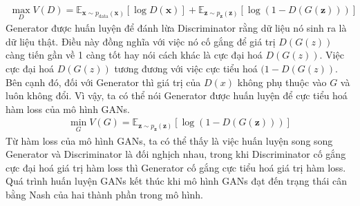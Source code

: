 {    \begin{align}
    \max_D V(D) = \mathbb{E}_{\bm{x} \sim p_{\text{data}}(\bm{x})}[\log D(\bm{x})] + \mathbb{E}_{\bm{z} \sim p_{\bm{z}}(\bm{z})}[\log (1 - D(G(\bm{z})))]
    \label{func:dis_loss}
    \end{align}
    Generator được huấn luyện để đánh lừa Discriminator rằng dữ liệu nó sinh ra là dữ liệu thật. Điều này đồng nghĩa với việc nó cố gắng để giá trị $D(G(z))$ càng tiến gần về 1 càng tốt hay nói cách khác là cực đại hoá $D(G(z))$. Việc cực đại hoá $D(G(z))$ tương đương với việc cực tiểu hoá $(1 - D(G(z))$. Bên cạnh đó, đối với Generator thì giá trị của $D(x)$ không phụ thuộc vào $G$ và luôn không đổi. Vì vậy, ta có thể nói Generator được huấn luyện để cực tiểu hoá hàm loss của mô hình GANs.
    \begin{align}
    \min_G V(G) = \mathbb{E}_{\bm{z} \sim p_{\bm{z}}(\bm{z})}[\log (1 - D(G(\bm{z})))]
    \label{func:gen_loss}
    \end{align}
    Từ hàm loss của mô hình GANs, ta có thể thấy là việc huấn luyện song song Generator và Discriminator là đối nghịch nhau, trong khi Discriminator cố gắng cực đại hoá giá trị hàm loss thì Generator cố gắng cực tiểu hoá giá trị hàm loss. Quá trình huấn luyện GANs kết thúc khi mô hình GANs đạt đến trạng thái cân bằng Nash của hai thành phần trong mô hình.
    
}
